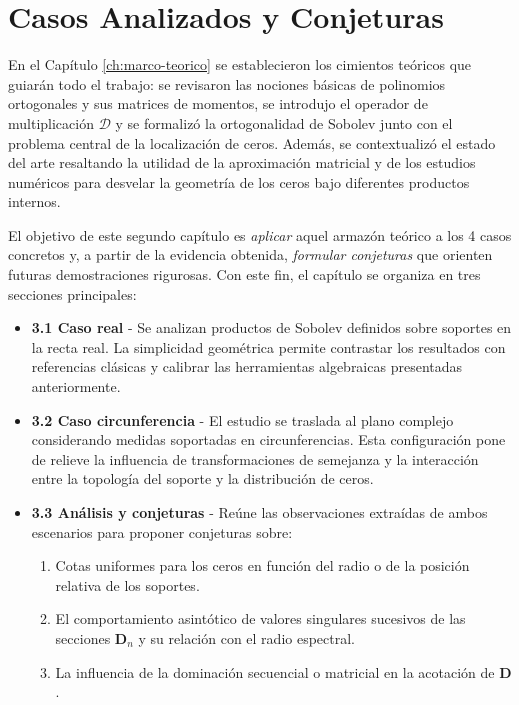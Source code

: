 \chapter{Casos Analizados y Conjeturas}
\label{ch:caso_real}

En el Capítulo \ref{ch:marco-teorico} se establecieron los cimientos teóricos que guiarán todo el trabajo: se revisaron las nociones básicas de polinomios ortogonales y sus matrices de momentos, se introdujo el operador de multiplicación \(\mathcal{D}\) y se formalizó la ortogonalidad de Sobolev junto con el problema central de la localización de ceros. Además, se contextualizó el estado del arte resaltando la utilidad de la aproximación matricial y de los estudios numéricos para desvelar la geometría de los ceros bajo diferentes productos internos.

El objetivo de este segundo capítulo es \emph{aplicar} aquel armazón teórico a los 4 casos concretos y, a partir de la evidencia obtenida, \emph{formular conjeturas} que orienten futuras demostraciones rigurosas. Con este fin, el capítulo se organiza en tres secciones principales:

\begin{itemize}
  \item \textbf{3.1 Caso real} - Se analizan productos de Sobolev definidos sobre soportes en la recta real. La simplicidad geométrica permite contrastar los resultados con referencias clásicas y calibrar las herramientas algebraicas presentadas anteriormente.
  \item \textbf{3.2 Caso circunferencia} - El estudio se traslada al plano complejo considerando medidas soportadas en circunferencias. Esta configuración pone de relieve la influencia de transformaciones de semejanza y la interacción entre la topología del soporte y la distribución de ceros.
  \item \textbf{3.3 Análisis y conjeturas} - Reúne las observaciones extraídas de ambos escenarios para proponer conjeturas sobre:
        \begin{enumerate}
          \item Cotas uniformes para los ceros en función del radio o de la posición relativa de los soportes.
          \item El comportamiento asintótico de valores singulares sucesivos de las secciones \(\mathbf{D}_n\) y su relación con el radio espectral.
          \item La influencia de la dominación secuencial o matricial en la acotación de \(\mathbf{D}\).
        \end{enumerate}
\end{itemize}

